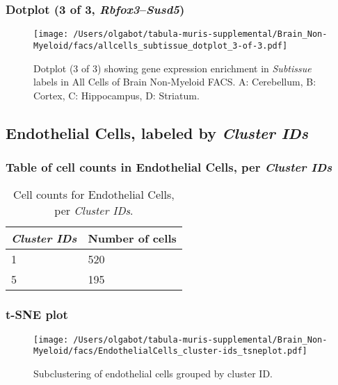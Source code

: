 \clearpage

\subsubsection{Dotplot (3 of 3, \emph{Rbfox3}--\emph{Susd5})}
\begin{figure}[h]
\centering
\texttt{[image: /Users/olgabot/tabula-muris-supplemental/Brain\_Non-Myeloid/facs/allcells\_subtissue\_dotplot\_3-of-3.pdf]}

\caption{ Dotplot (3 of 3)  showing gene expression enrichment in \emph{Subtissue} labels in All Cells of Brain Non-Myeloid FACS. A: Cerebellum, B: Cortex, C: Hippocampus, D: Striatum.}
\end{figure}


\clearpage

\subsection{Endothelial Cells, labeled by \emph{Cluster IDs}}
\subsubsection{Table of cell counts in Endothelial Cells, per \emph{Cluster IDs}}\begin{table}[h]
\centering
\label{my-label}
\begin{tabular}{@{}ll@{}}
\toprule

\emph{Cluster IDs}& Number of cells \\ \midrule
1 & 520 \\

5 & 195 \\
\bottomrule
\end{tabular}
\caption{Cell counts for Endothelial Cells, per \emph{Cluster IDs}.}
\end{table}

\clearpage
\subsubsection{t-SNE plot}
\begin{figure}[h]
\centering
\texttt{[image: /Users/olgabot/tabula-muris-supplemental/Brain\_Non-Myeloid/facs/EndothelialCells\_cluster-ids\_tsneplot.pdf]}

\caption{Subclustering of endothelial cells grouped by cluster ID.
}
\end{figure}


